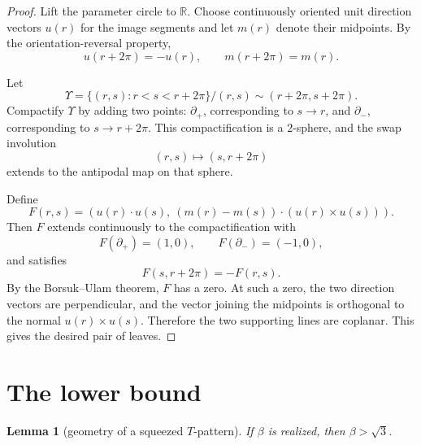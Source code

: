 \documentclass[11pt]{article}
\newtheorem{lemma}[theorem]{Lemma}
\newcommand{\R}{\mathbb R}
\begin{document}
\begin{proof}
Lift the parameter circle to \(\R\).  Choose continuously oriented unit direction vectors \(u(r)\) for the image segments and let \(m(r)\) denote their midpoints.  By the orientation-reversal property,
\[
u(r+2\pi)=-u(r),\qquad m(r+2\pi)=m(r).
\]

Let
\[
\Upsilon=\{(r,s): r<s<r+2\pi\}/(r,s)\sim(r+2\pi,s+2\pi).
\]
Compactify \(\Upsilon\) by adding two points: \(\partial_+\), corresponding to \(s\to r\), and \(\partial_-\), corresponding to \(s\to r+2\pi\).  This compactification is a \(2\)-sphere, and the swap involution
\[
(r,s)\longmapsto (s,r+2\pi)
\]
extends to the antipodal map on that sphere.

Define
\[
F(r,s)=\left(u(r)\cdot u(s),\ (m(r)-m(s))\cdot (u(r)\times u(s))\right).
\]
Then \(F\) extends continuously to the compactification with
\[
F(\partial_+)=(1,0),\qquad F(\partial_-)=(-1,0),
\]
and satisfies
\[
F(s,r+2\pi)=-F(r,s).
\]
By the Borsuk--Ulam theorem, \(F\) has a zero.  At such a zero, the two direction vectors are perpendicular, and the vector joining the midpoints is orthogonal to the normal \(u(r)\times u(s)\).  Therefore the two supporting lines are coplanar.  This gives the desired pair of leaves.
\end{proof}

\section{The lower bound}

\begin{lemma}[geometry of a squeezed \(T\)-pattern]
If \(\beta\) is realized, then \(\beta>\sqrt 3\).
\end{lemma}
\end{document}
